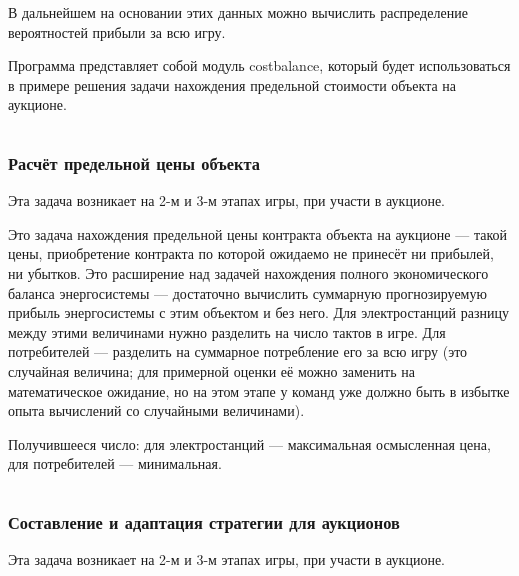 В дальнейшем на основании этих данных можно вычислить распределение вероятностей прибыли за всю игру.

\solutionSection

Программа представляет собой модуль costbalance, который будет использоваться в примере решения задачи нахождения предельной стоимости объекта на аукционе.

\inputminted[fontsize=\footnotesize, linenos]{python}{final/command_tour/ies/task_01/subtask_02/source_2.py}

\subsubsection*{Расчёт предельной цены объекта}

Эта задача возникает на 2-м и 3-м этапах игры, при участи в аукционе.

Это задача нахождения предельной цены контракта объекта на аукционе — такой цены, приобретение контракта по которой ожидаемо не принесёт ни прибылей, ни убытков. Это расширение над задачей нахождения полного экономического баланса энергосистемы — достаточно вычислить суммарную прогнозируемую прибыль энергосистемы с этим объектом и без него. Для электростанций разницу между этими величинами нужно разделить на число тактов в игре. Для потребителей — разделить на суммарное потребление его за всю игру (это случайная величина; для примерной оценки её можно заменить на математическое ожидание, но на этом этапе у команд уже должно быть в избытке опыта вычислений со случайными величинами).

Получившееся число: для электростанций — максимальная осмысленная цена, для потребителей — минимальная.

\solutionSection

\inputminted[fontsize=\footnotesize, linenos]{python}{final/command_tour/ies/task_01/subtask_02/source_3.py}

\subsubsection*{Составление и адаптация стратегии для аукционов}

Эта задача возникает на 2-м и 3-м этапах игры, при участи в аукционе.

